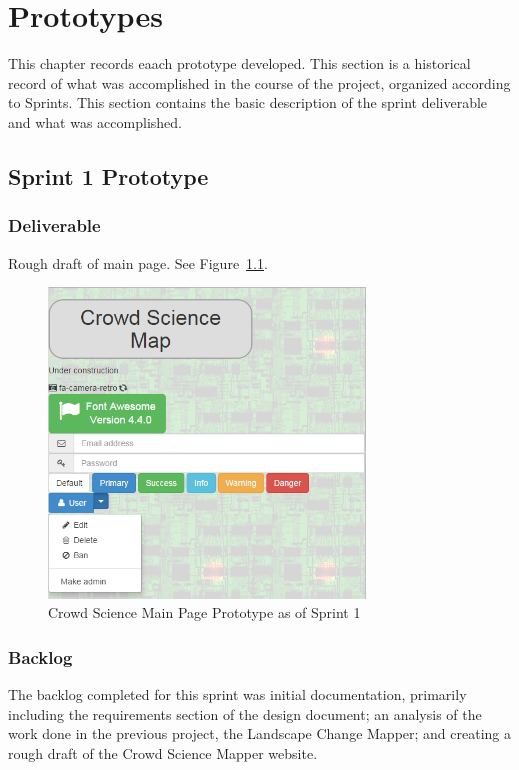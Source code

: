 

\chapter{Prototypes}

This chapter records eaach prototype developed.  This section is a historical record of what was accomplished in the course of the project, organized according to Sprints.  This section contains the basic description of the sprint deliverable and what was accomplished.  

\section{Sprint 1 Prototype}
\subsection{Deliverable}
Rough draft of main page. See Figure~\ref{prototype_S1_main}.

\begin{figure}[tbh]
\begin{center}
\includegraphics[width=0.75\textwidth]{./figures/prototype_S1_main.png}
\end{center}
\caption{Crowd Science Main Page Prototype as of Sprint 1\label{prototype_S1_main}}
\end{figure}

\subsection{Backlog}
The backlog completed for this sprint was initial documentation, primarily including the requirements section of the design document; an analysis of the work done in the previous project, the Landscape Change Mapper; and creating a rough draft of the Crowd Science Mapper website.
